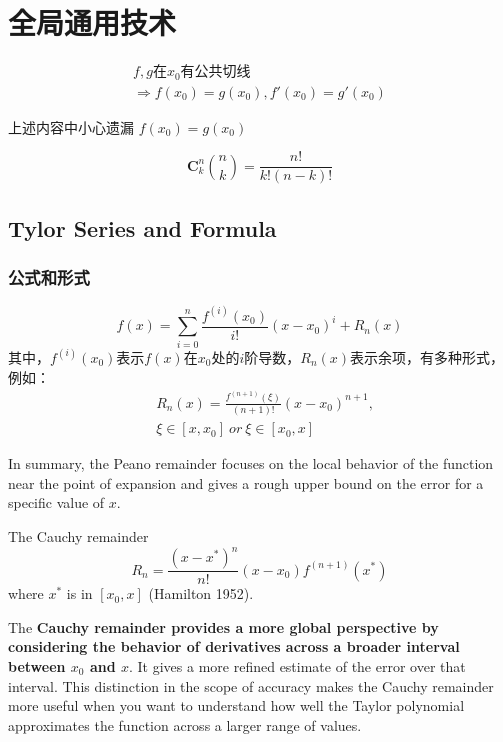 \chapter{全局通用技术}

\begin{lemma}
\begin{multline*}
	f, g \mbox{在} x_0 \mbox{有公共切线} \\ \Rightarrow f(x_0) = g(x_0), f'(x_0) = g'(x_0)
\end{multline*}
\end{lemma}
上述内容中小心遗漏 $f(x_0) = g(x_0)$

\begin{definition}
    \begin{equation}
        \mathbf{C}_{k}^{n}\binom{n}{k} = \frac{n!}{k!(n-k)!}
    \end{equation}
\end{definition}

\section{Tylor Series and Formula} \label{tylor}

\subsection{公式和形式}

\begin{definition}[泰勒公式的一般形式]
	\begin{equation}
		f(x)=\sum_{i=0}^{n}{\frac{f^{(i)}(x_0)}{i!}(x-x_0)^i}+R_n(x)
	\end{equation}
	其中，$f^{(i)}(x_0)$表示$f(x)$在$x_0$处的$i$阶导数，$R_n(x)$表示余项，有多种形式，例如：
	\begin{align*}
		&R_n(x)=\frac{f^{(n+1)}(\xi)}{(n+1)!}(x-x_0)^{n+1}, \\ &\xi \in [x,x_0]\ or \ \xi \in [x_0,x]
	\end{align*}
\end{definition}

In summary, the Peano remainder focuses on 
the local behavior of the function near the point of expansion 
and gives a rough upper bound on the error for a specific value of $x$. 
\begin{definition}{The Cauchy remainder}
    \[
        R_n=\dfrac{(x-x^*)^n}{n!}(x-x_0)f^{(n+1)}(x^*)
    \]
    where $x^*$ is in $[x_0,x]$ (Hamilton 1952).
\end{definition}
The \textbf{Cauchy remainder provides a more global perspective by 
considering the behavior of derivatives across a broader 
interval between $x_0$ and $x$}. It gives a more refined estimate 
of the error over that interval. This distinction in the scope 
of accuracy makes the Cauchy remainder more useful when you want 
to understand how well the Taylor polynomial approximates the function 
across a larger range of values.

